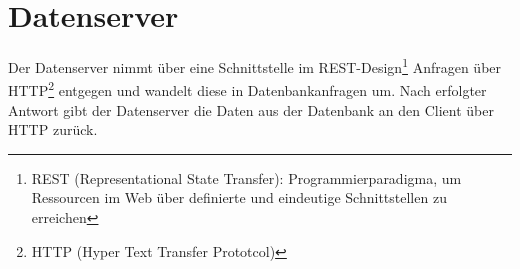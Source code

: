 \section{Datenserver}
Der Datenserver nimmt über eine Schnittstelle im REST-Design\footnote{REST 
(Representational State Transfer): Programmierparadigma, um Ressourcen im Web über 
definierte und eindeutige Schnittstellen zu erreichen} Anfragen über HTTP\footnote{HTTP 
(Hyper Text Transfer Prototcol)} entgegen und wandelt diese in Datenbankanfragen um. 
Nach erfolgter Antwort gibt der Datenserver die Daten aus der Datenbank an den Client 
über HTTP zurück.